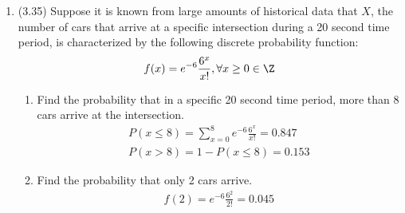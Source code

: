 \documentclass[basic, header]{nosvagor-notes}
\begin{document}
\begin{enumerate}[itemsep=4em]
  \item (3.35) Suppose it is known from large amounts of historical data that
    \(X\), the number of cars that arrive at a specific intersection during a
    20 second time period, is characterized by the following discrete
    probability function:
    \[%
      f(x) = e^{-6}\frac{6^x}{x!}, \forall x \geq 0 \in \Z
    \]%
    \begin{enumerate}

      \item Find the probability that in a specific 20 second
        time period, more than 8 cars arrive at the intersection.
        \begin{align*}
          P(x \leq 8) = \sum_{x=0}^{8} e^{-6} \frac{6^{x}}{x!} = 0.847 \\
          P(x > 8) = 1 - P(x \leq 8) = \boxed{0.153}
        \end{align*}

      \item Find the probability that only 2 cars arrive.
        \begin{align*}
          f(2) = e^{-6}\frac{6^2}{2!} = \boxed{0.045}
        \end{align*}

    \end{enumerate}


\end{enumerate}
\end{document}
